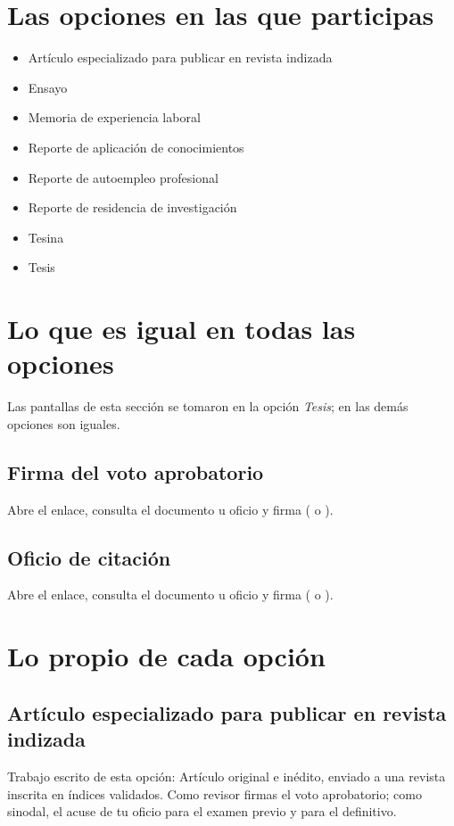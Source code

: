 \section{Las opciones en las que participas}
\begin{itemize}
  \item Artículo especializado para publicar en revista indizada
  \item Ensayo
  \item Memoria de experiencia laboral
  \item Reporte de aplicación de conocimientos
  \item Reporte de autoempleo profesional
  \item Reporte de residencia de investigación
  \item Tesina
  \item Tesis
\end{itemize}
\section{Lo que es igual en todas las opciones}
Las pantallas de esta sección se tomaron en la opción \emph{Tesis}; en las demás opciones son iguales.
\subsection{Firma del voto aprobatorio}
Abre el enlace, consulta el documento u oficio y firma ( o ).
\subsection{Oficio de citación}
Abre el enlace, consulta el documento u oficio y firma ( o ).
\section{Lo propio de cada opción}
\subsection{Artículo especializado para publicar en revista indizada}
Trabajo escrito de esta opción: Artículo original e inédito, enviado a una revista inscrita en índices validados. Como revisor firmas el voto aprobatorio; como sinodal, el acuse de tu oficio para el examen previo y para el definitivo.
